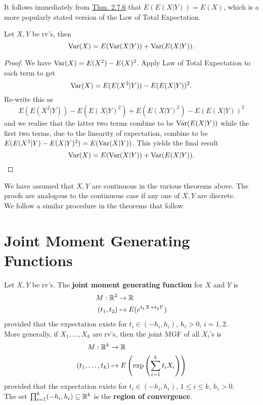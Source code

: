 \documentclass[11pt,fleqn]{book} %
\begin{document}
\begin{remark} It follows immediately from \hyperref[thm:276]{Thm. 2.7.6} that \(E(E(X|Y)) = E(X)\), which is a more popularly stated version of the Law of Total Expectation.
\end{remark}

\begin{theorem}
\label{thm:278}
Let \(X, Y\) be rv's, then
\[
\operatorname{Var}(X) = E(\operatorname{Var}(X|Y)) + \operatorname{Var}(E(X|Y)).
\]
\end{theorem}
\begin{proof} We have \(\operatorname{Var}(X) = E(X^2) - E(X)^2\). Apply Law of Total Expectation to each term to get
\[
\operatorname{Var}(X) = E(E(X^2|Y)) - E(E(X|Y))^2.
\]
\indent Re-write this as 
\[
E(E(X^2|Y)) - E(E(X|Y)^2) + E(E(X|Y)^2) - E(E(X|Y))^2
\]
and we realise that the latter two terms combine to be \(\operatorname{Var}(E(X|Y))\) while the first two terms, due to the linearity of expectation, combine to be \(E(E(X^2|Y) - E(X|Y)^2) = E(\operatorname{Var}(X|Y))\). This yields the final result
\[
\operatorname{Var}(X) = E(\operatorname{Var}(X|Y)) + \operatorname{Var}(E(X|Y)).
\]
\end{proof}

\begin{remark} We have assumed that \(X, Y\) are continuous in the various theorems above. The proofs are analogous to the continuous case if any one of \(X, Y\) are discrete. \\
\indent We follow a similar procedure in the theorems that follow.
\end{remark}


\section{Joint Moment Generating Functions}

\begin{definition}
Let \(X, Y\) be rv's. The \textbf{joint moment generating function} for \(X\) and \(Y\) is
\[
\begin{aligned}
M: \mathbb{R}^2 &\rightarrow \mathbb{R} \\
(t_1, t_2) &\mapsto E(e^{t_1X + t_2Y})
\end{aligned}
\]
provided that the expectation exists for \(t_i \in (-h_i, h_i)\), \(h_i > 0\), \(i = 1, 2\).\\
\indent More generally, if \(X_1, \ldots, X_k\) are rv's, then the joint MGF of all \(X_i\)'s is
\[
\begin{aligned}
M: \mathbb{R}^k &\rightarrow \mathbb{R} \\
(t_1, \ldots, t_k) &\mapsto E\left(\exp\left(\sum_{i=1}^k t_iX_i\right)\right)
\end{aligned}
\]
provided that the expectation exists for \(t_i \in (-h_i, h_i)\), \(1 \leq i \leq k\), \(h_i > 0\).\\
\indent The set \(\prod_{i=1}^k (-h_i, h_i) \subseteq \mathbb{R}^k\) is the \textbf{region of convergence}.
\end{definition}
\end{document}
